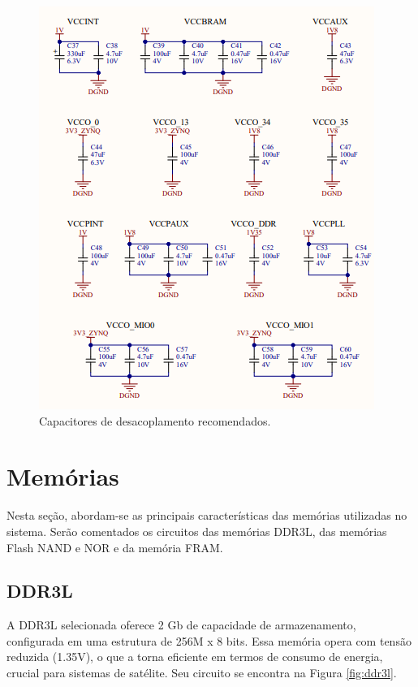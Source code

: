 \begin{figure}[H]
    \centering
    \includegraphics[scale=0.7]{images/zynqcaps.png}
    \caption{Capacitores de desacoplamento recomendados.}
    \label{fig:zcaps}
\end{figure}

\section{Memórias}

Nesta seção, abordam-se as principais características das memórias utilizadas no sistema. Serão comentados os circuitos das memórias DDR3L, das memórias Flash NAND e NOR e da memória FRAM.

\subsection{DDR3L} 

A DDR3L selecionada oferece 2 Gb de capacidade de armazenamento, configurada em uma estrutura de 256M x 8 bits. Essa memória opera com tensão reduzida (1.35V), o que a torna eficiente em termos de consumo de energia, crucial para sistemas de satélite. Seu circuito se encontra na Figura \ref{fig:ddr3l}. 

